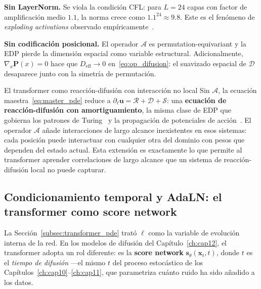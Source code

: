 \medskip
\noindent\textbf{Sin LayerNorm.} Se viola la condición CFL: para
$L = 24$ capas con factor de amplificación medio $1.1$, la norma
crece como $1.1^{24} \approx 9.8$. Este es el fenómeno de
\textit{exploding activations} observado
empíricamente~\cite{transformer_pde_2024}.

\medskip
\noindent\textbf{Sin codificación posicional.} El operador
$\mathcal{A}$ es permutation-equivariant y la EDP pierde la
dimensión espacial como variable estructural. Adicionalmente,
$\nabla_x\bm{P}(x) = 0$ hace que $D_{\mathrm{eff}} \to 0$
en~\eqref{eq:op_difusion}: el suavizado espacial de $\mathcal{D}$
desaparece junto con la simetría de permutación.

\begin{fisicaconexion}{El transformer como reacción-difusión
con interacción no local}
Sin $\mathcal{A}$, la ecuación maestra~\eqref{eq:master_pde}
reduce a $\partial_\ell\bm{u} = \mathcal{R} + \mathcal{D} +
\mathcal{S}$: una \textbf{ecuación de reacción-difusión con
amortiguamiento}, la misma clase de EDP que gobierna los
patrones de Turing~\cite{turing1952chemical} y la propagación
de potenciales de acción~\cite{hodgkin1952quantitative}. El
operador $\mathcal{A}$ añade interacciones de largo alcance
inexistentes en esos sistemas: cada posición puede interactuar
con cualquier otra del dominio con pesos que dependen del estado
actual. Esta extensión es exactamente lo que permite al
transformer aprender correlaciones de largo alcance que un
sistema de reacción-difusión local no puede capturar.
\end{fisicaconexion}

\subsection{Condicionamiento temporal y AdaLN: el transformer
            como score network}
\label{subsec:adialn}

La Sección~\ref{subsec:transformer_pde} trató $\ell$ como la
variable de evolución interna de la red. En los modelos de difusión
del Capítulo~\ref{ch:cap12}, el transformer adopta un rol diferente:
es la \textbf{score network} $\bm{s}_\theta(\bm{x}_t, t)$, donde
$t$ es el \emph{tiempo de difusión} —el mismo $t$ del proceso
estocástico de los Capítulos~\ref{ch:cap10}--\ref{ch:cap11}, que
parametriza cuánto ruido ha sido añadido a los datos.

